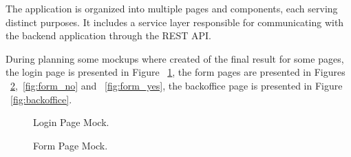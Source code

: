 The application is organized into multiple pages and components, each serving distinct purposes. It includes a service layer responsible for communicating with the backend application through the REST API.

During planning some mockups where created of the final result for some pages, the login page is presented in Figure ~\ref{fig:login}, the form pages are presented in Figures ~\ref{fig:form},~\ref{fig:form_no} and ~\ref{fig:form_yes}, the backoffice page is presented in Figure ~\ref{fig:backoffice}.

\begin{figure}[H]
	\begin{center}
	\end{center}
	\caption{Login Page Mock.}\label{fig:login}
\end{figure}

\begin{figure}[H]
	\begin{center}
	\end{center}
	\caption{Form Page Mock.}\label{fig:form}
\end{figure}


